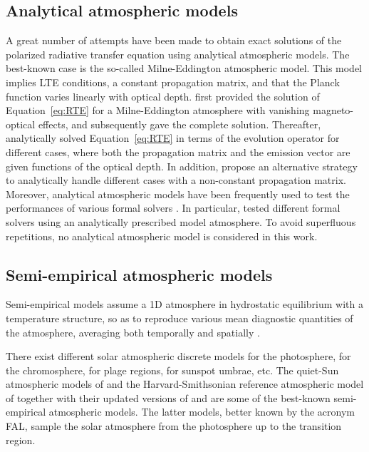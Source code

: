 \documentclass[iop,numberedappendix,twocolappendix,twocolumn]{emulateapj}
\begin{document}
\subsection{Analytical atmospheric models}\label{subsec:2.2}
%
A great number of attempts have been made to obtain exact solutions of the polarized radiative transfer equation using analytical atmospheric models.
The best-known case is the so-called Milne-Eddington atmospheric model. This model implies LTE conditions, a constant propagation matrix,
and that the Planck function varies linearly with optical depth.
\citet{unno1956} first provided the solution of Equation~\eqref{eq:RTE} for a Milne-Eddington atmosphere with vanishing magneto-optical effects, and
\citet{rachkovsky1967} subsequently gave the complete solution.
Thereafter, \citet{landi_deglinnocenti1987} analytically solved Equation~\eqref{eq:RTE} in terms of the evolution operator for different cases, where both the propagation matrix and the emission vector are given functions of the optical depth. In addition, \citet{lopez1999b} propose an alternative strategy to analytically handle different cases with a non-constant propagation matrix.
Moreover, analytical atmospheric models have been frequently used to test the performances of various formal solvers \citep[e.g.,][]{bellot_rubio+al1998,stepan+trujillo_bueno2013}. In particular, \citet{janett2017a,janett2017b} tested different formal solvers using an analytically prescribed model atmosphere.
To avoid superfluous repetitions, no analytical atmospheric model is considered in this work.
%
\subsection{Semi-empirical atmospheric models}\label{subsec:2.3}
%
Semi-empirical models  %
assume a 1D atmosphere in hydrostatic equilibrium with a temperature structure,
so as to reproduce various mean diagnostic quantities of
the atmosphere, averaging both temporally and spatially \citep{mauas2007}.

There exist different solar atmospheric discrete models for the photosphere, for the chromosphere, for plage regions, for sunspot umbrae, etc.
The quiet-Sun atmospheric models of \citet{holweger1974} and the Harvard-Smithsonian reference atmospheric model of \citet{gingerich1971} together with their updated versions of \citet{vernazza1981} and \citet{fontenla1990,fontenla1991,fontenla1993,fontenla1999}
are some of the best-known semi-empirical atmospheric models. The latter models, better known by the acronym FAL, 
sample the solar atmosphere from the photosphere up to the transition region.
\end{document}
